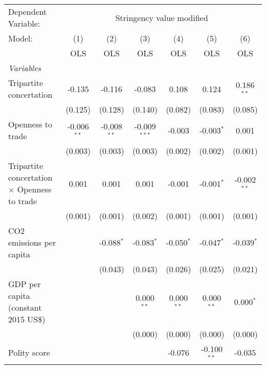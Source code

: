 
\begingroup
\centering
\begin{tabular}{lcccccc}
   \toprule
   Dependent Variable: & \multicolumn{6}{c}{Stringency value modified}\\
   Model:                                              & (1)           & (2)           & (3)            & (4)          & (5)           & (6)\\  
                                                       &  OLS          & OLS           & OLS            & OLS          & OLS           & OLS\\  
   \midrule
   \emph{Variables}\\
   Tripartite concertation                             & -0.135        & -0.116        & -0.083         & 0.108        & 0.124         & 0.186$^{**}$\\   
                                                       & (0.125)       & (0.128)       & (0.140)        & (0.082)      & (0.083)       & (0.085)\\   
   Openness to trade                                   & -0.006$^{**}$ & -0.008$^{**}$ & -0.009$^{***}$ & -0.003       & -0.003$^{*}$  & 0.001\\   
                                                       & (0.003)       & (0.003)       & (0.003)        & (0.002)      & (0.002)       & (0.001)\\   
   Tripartite concertation $\times$ Openness to trade  & 0.001         & 0.001         & 0.001          & -0.001       & -0.001$^{*}$  & -0.002$^{**}$\\   
                                                       & (0.001)       & (0.001)       & (0.002)        & (0.001)      & (0.001)       & (0.001)\\   
   CO2 emissions per capita                            &               & -0.088$^{*}$  & -0.083$^{*}$   & -0.050$^{*}$ & -0.047$^{*}$  & -0.039$^{*}$\\   
                                                       &               & (0.043)       & (0.043)        & (0.026)      & (0.025)       & (0.021)\\   
   GDP per capita (constant 2015 US\$)                 &               &               & 0.000$^{**}$   & 0.000$^{**}$ & 0.000$^{**}$  & 0.000$^{*}$\\   
                                                       &               &               & (0.000)        & (0.000)      & (0.000)       & (0.000)\\   
   Polity score                                        &               &               &                & -0.076       & -0.100$^{**}$ & -0.035\\   

\end{tabular}
